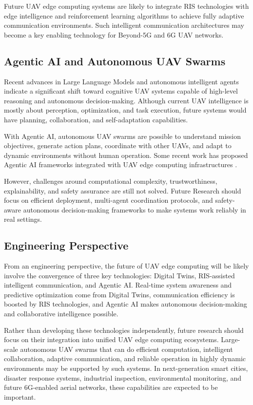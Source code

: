 \documentclass[a4paper, 12pt]{article}
\begin{document}
Future UAV edge computing systems are likely to integrate RIS technologies with edge intelligence and reinforcement learning algorithms to achieve fully adaptive communication environments. Such intelligent communication architectures may become a key enabling technology for Beyond-5G and 6G UAV networks.

\subsection*{Agentic AI and Autonomous UAV Swarms}
Recent advances in Large Language Models and autonomous intelligent agents indicate a significant shift toward cognitive UAV systems capable of high-level reasoning and autonomous decision-making. Although current UAV intelligence is mostly about perception, optimization, and task execution, future systems would have planning, collaboration, and self-adaptation capabilities.

With Agentic AI, autonomous UAV swarms are possible to understand mission objectives, generate action plans, coordinate with other UAVs, and adapt to dynamic environments without human operation. Some recent work has proposed Agentic AI frameworks integrated with UAV edge computing infrastructures \cite{Nguyen2026AgenticAI}.

However, challenges around computational complexity, trustworthiness, explainability, and safety assurance are still not solved. Future Research should focus on efficient deployment, multi-agent coordination protocols, and safety-aware autonomous decision-making frameworks to make systems work reliably in real settings.

\subsection*{Engineering Perspective}
From an engineering perspective, the future of UAV edge computing will be likely involve the convergence of three key technologies: Digital Twins, RIS-assisted intelligent communication, and Agentic AI. Real-time system awareness and predictive optimization come from Digital Twins, communication efficiency is boosted by RIS technologies, and Agentic AI makes autonomous decision-making and collaborative intelligence possible.

Rather than developing these technologies independently, future research should focus on their integration into unified UAV edge computing ecosystems. Large-scale autonomous UAV swarms that can do efficient computation, intelligent collaboration, adaptive communication, and reliable operation in highly dynamic environments may be supported by such systems. In next-generation smart cities, disaster response systems, industrial inspection, environmental monitoring, and future 6G-enabled aerial networks, these capabilities are expected to be important.
\end{document}
